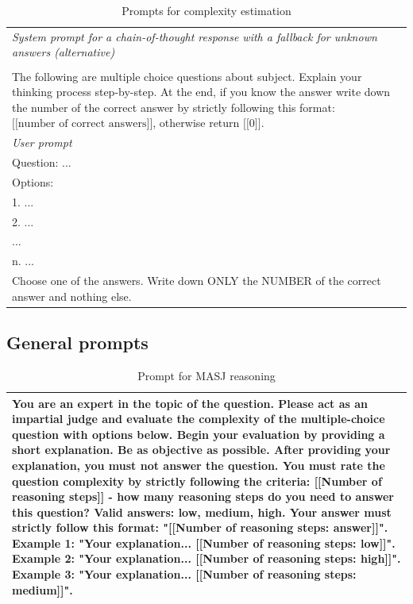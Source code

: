 \begin{table}[H]
\begin{tabularx}{\linewidth}{X}
\\
\hline 
\emph{System prompt for a chain-of-thought response with a fallback for unknown answers (alternative)} \\
\\
The following are multiple choice questions about {subject}. Explain your thinking process step-by-step. At the end, if you know the answer write down the number of the correct answer by strictly following this format: $\lbrack\lbrack\text{number of correct answers}\rbrack\rbrack$, otherwise return $\lbrack\lbrack\text{0}\rbrack\rbrack$.
\\
\hline 
\emph{User prompt} \\
Question: ...\\
Options:\\
1. ...\\
2. ...\\
...\\
n. ...\\
Choose one of the answers. Write down ONLY the NUMBER of the correct answer and nothing else.
\\
\hline
\end{tabularx}
\caption{Prompts for complexity estimation}
\label{tab:prs_uqs_uq}
\end{table}

\subsection{General prompts}


\begin{table}[H]
\small
\centering
\begin{tabularx}{\linewidth}{X}
\hline
You are an expert in the topic of the question. Please act as an impartial judge and evaluate the complexity of the multiple-choice question with options below.
Begin your evaluation by providing a short explanation. Be as objective as possible. After providing your explanation, you must not answer the question.
You must rate the question complexity by strictly following the criteria:
[[Number of reasoning steps]] - how many reasoning steps do you need to answer this question? Valid answers: low, medium, high.
Your answer must strictly follow this format: "[[Number of reasoning steps: answer]]".
Example 1: "Your explanation... [[Number of reasoning steps: low]]".
Example 2: "Your explanation... [[Number of reasoning steps: high]]".
Example 3: "Your explanation... [[Number of reasoning steps: medium]]".
\\
\hline 
\end{tabularx}
\caption{Prompt for MASJ reasoning}
\label{tab:prompt_masj_reasoning}
\end{table}

